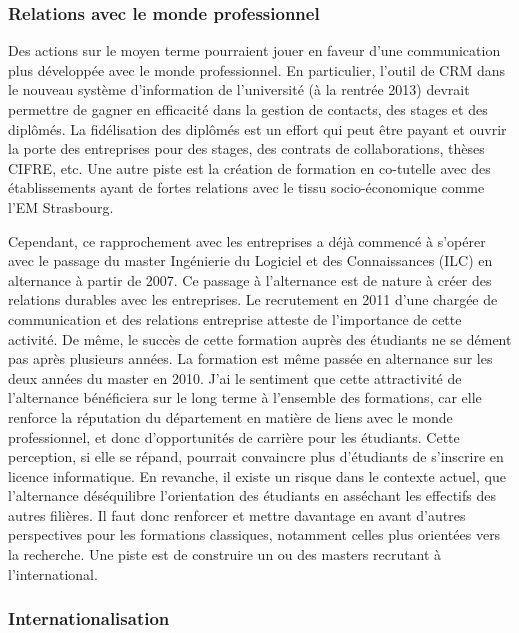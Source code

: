 \documentclass[11pt]{article}
\begin{document}

\subsubsection{Relations avec le monde professionnel}

Des actions sur le moyen terme pourraient jouer en faveur d'une communication 
plus développée avec le monde professionnel. En particulier, l'outil de CRM 
dans le nouveau système d'information de l'université (à la rentrée 2013) 
devrait permettre de gagner en efficacité dans la gestion de contacts, des 
stages et des diplômés. La fidélisation des diplômés est un effort qui peut 
être payant et ouvrir la porte des entreprises pour des stages, des contrats 
de collaborations, thèses CIFRE, etc. Une autre piste est la création de 
formation en co-tutelle avec des établissements ayant de fortes relations avec
le tissu socio-économique comme l'EM Strasbourg.

Cependant, ce rapprochement avec les entreprises a déjà commencé à s'opérer 
avec le passage du master Ingénierie du Logiciel et des Connaissances (ILC) en 
alternance à partir de 2007. Ce passage à l'alternance est de nature à créer des
relations durables avec les entreprises. Le recrutement en 2011 d'une chargée de 
communication et des relations entreprise atteste de l'importance de cette activité.
De même, le succès de cette formation auprès des étudiants ne se dément pas après 
plusieurs années. La formation est même passée en alternance sur les deux années 
du master en 2010. J'ai le sentiment que cette attractivité de l'alternance bénéficiera 
sur le long terme à l'ensemble des formations, car elle renforce la réputation du 
département en matière de liens avec le monde professionnel, et donc d'opportunités 
de carrière pour les étudiants. Cette perception, si elle se répand, pourrait 
convaincre plus d'étudiants de s'inscrire en licence informatique.
En revanche, il existe un risque dans le contexte actuel, que l'alternance 
déséquilibre l'orientation des étudiants en asséchant les effectifs des autres 
filières. Il faut donc renforcer et mettre davantage en avant d'autres perspectives
pour les formations classiques, notamment celles plus orientées vers la recherche. 
Une piste est de construire un ou des masters recrutant à l'international.


\subsubsection{Internationalisation}
\end{document}
